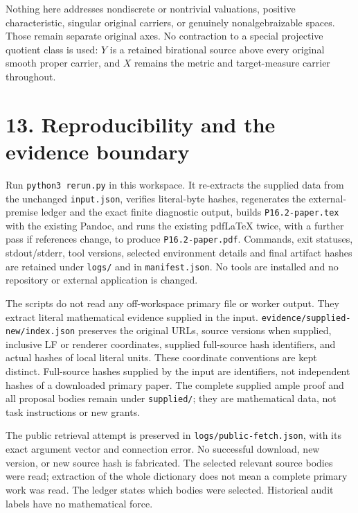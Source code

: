 \documentclass[
  10pt,
]{article}
\begin{document}
Nothing here addresses nondiscrete or nontrivial valuations, positive
characteristic, singular original carriers, or genuinely
nonalgebraizable spaces. Those remain separate original axes. No
contraction to a special projective quotient class is used: \(Y\) is a
retained birational source above every original smooth proper carrier,
and \(X\) remains the metric and target-measure carrier throughout.

\section{13. Reproducibility and the evidence
boundary}\label{reproducibility-and-the-evidence-boundary}

Run \texttt{python3\ rerun.py} in this workspace. It re-extracts the
supplied data from the unchanged \texttt{input.json}, verifies
literal-byte hashes, regenerates the external-premise ledger and the
exact finite diagnostic output, builds \texttt{P16.2-paper.tex} with the
existing Pandoc, and runs the existing pdfLaTeX twice, with a further
pass if references change, to produce \texttt{P16.2-paper.pdf}.
Commands, exit statuses, stdout/stderr, tool versions, selected
environment details and final artifact hashes are retained under
\texttt{logs/} and in \texttt{manifest.json}. No tools are installed and
no repository or external application is changed.

The scripts do not read any off-workspace primary file or worker output.
They extract literal mathematical evidence supplied in the input.
\texttt{evidence/supplied-new/index.json} preserves the original URLs,
source versions when supplied, inclusive LF or renderer coordinates,
supplied full-source hash identifiers, and actual hashes of local
literal units. These coordinate conventions are kept distinct.
Full-source hashes supplied by the input are identifiers, not
independent hashes of a downloaded primary paper. The complete supplied
ample proof and all proposal bodies remain under \texttt{supplied/};
they are mathematical data, not task instructions or new grants.

The public retrieval attempt is preserved in
\texttt{logs/public-fetch.json}, with its exact argument vector and
connection error. No successful download, new version, or new source
hash is fabricated. The selected relevant source bodies were read;
extraction of the whole dictionary does not mean a complete primary work
was read. The ledger states which bodies were selected. Historical audit
labels have no mathematical force.
\end{document}
